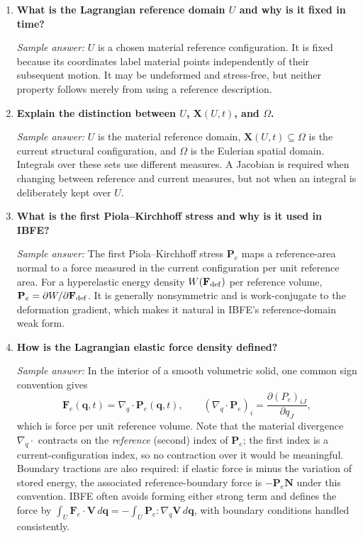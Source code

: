 \documentclass[11pt]{article}
\begin{document}
\begin{enumerate}[label=\arabic*., resume]

\item \textbf{What is the Lagrangian reference domain $U$ and why is it fixed in time?}

\textit{Sample answer:}  
$U$ is a chosen material reference configuration. It is fixed because its
coordinates label material points independently of their subsequent motion.
It may be undeformed and stress-free, but neither property follows merely from
using a reference description.

\item \textbf{Explain the distinction between $U$, $\mathbf{X}(U,t)$, and $\Omega$.}

\textit{Sample answer:}
$U$ is the material reference domain,
$\mathbf{X}(U,t)\subseteq\Omega$ is the current structural configuration,
and $\Omega$ is the Eulerian spatial domain. Integrals over these sets use
different measures. A Jacobian is required when changing between reference and
current measures, but not when an integral is deliberately kept over $U$.

\item \textbf{What is the first Piola--Kirchhoff stress and why is it used in IBFE?}

\textit{Sample answer:}  
The first Piola--Kirchhoff stress $\mathbf{P}_e$ maps a reference-area normal to
a force measured in the current configuration per unit reference area. For a
hyperelastic energy density $W(\mathbf{F}_{\rm def})$ per reference volume,
$\mathbf{P}_e=\partial W/\partial\mathbf{F}_{\rm def}$. It is generally nonsymmetric and is
work-conjugate to the deformation gradient, which makes it natural in IBFE's
reference-domain weak form.

\item \textbf{How is the Lagrangian elastic force density defined?}

\textit{Sample answer:}  
In the interior of a smooth volumetric solid, one common sign convention gives
\[
\mathbf{F}_e(\mathbf{q},t) = \nabla_{\!q} \cdot \mathbf{P}_e(\mathbf{q},t),
\qquad
(\nabla_{\!q}\cdot\mathbf{P}_e)_i=\frac{\partial (P_e)_{iJ}}{\partial q_J},
\]
which is force per unit reference volume. Note that the material divergence
$\nabla_{\!q}\cdot$ contracts on the \emph{reference} (second) index of
$\mathbf{P}_e$; the first index is a current-configuration index, so no
contraction over it would be meaningful. Boundary tractions are also required:
if elastic force is minus the variation of stored energy, the associated
reference-boundary force is $-\mathbf{P}_e\mathbf{N}$ under this convention.
IBFE often avoids forming either strong term and defines the force by
$\int_U\mathbf{F}_e\cdot\mathbf{V}\,d\mathbf{q}
=-\int_U\mathbf{P}_e:\nabla_{\!q}\mathbf{V}\,d\mathbf{q}$, with boundary conditions
handled consistently.

\end{enumerate}
\end{document}
